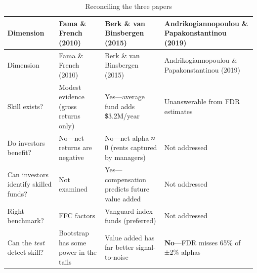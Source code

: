 \documentclass[
  letterpaper,
  DIV=11,
  numbers=noendperiod]{scrartcl}
\begin{document}
\begin{longtable}[]{@{}
  >{\raggedright\arraybackslash}p{}
  >{\raggedright\arraybackslash}p{}
  >{\raggedright\arraybackslash}p{}
  >{\raggedright\arraybackslash}p{}@{}}
\caption{Reconciling the three papers}\tabularnewline
\toprule\noalign{}
\begin{minipage}[b]{\linewidth}\raggedright
Dimension
\end{minipage} & \begin{minipage}[b]{\linewidth}\raggedright
Fama \& French (2010)
\end{minipage} & \begin{minipage}[b]{\linewidth}\raggedright
Berk \& van Binsbergen (2015)
\end{minipage} & \begin{minipage}[b]{\linewidth}\raggedright
Andrikogiannopoulou \& Papakonstantinou (2019)
\end{minipage} \\
\midrule\noalign{}
\endfirsthead
\toprule\noalign{}
\begin{minipage}[b]{\linewidth}\raggedright
Dimension
\end{minipage} & \begin{minipage}[b]{\linewidth}\raggedright
Fama \& French (2010)
\end{minipage} & \begin{minipage}[b]{\linewidth}\raggedright
Berk \& van Binsbergen (2015)
\end{minipage} & \begin{minipage}[b]{\linewidth}\raggedright
Andrikogiannopoulou \& Papakonstantinou (2019)
\end{minipage} \\
\midrule\noalign{}
\endhead
\bottomrule\noalign{}
\endlastfoot
Skill exists? & Modest evidence (gross returns only) & Yes---average
fund adds \$3.2M/year & Unanswerable from FDR estimates \\
Do investors benefit? & No---net returns are negative & No---net alpha ≈
0 (rents captured by managers) & Not addressed \\
Can investors identify skilled funds? & Not examined &
Yes---compensation predicts future value added & Not addressed \\
Right benchmark? & FFC factors & Vanguard index funds (preferred) & Not
addressed \\
Can the \emph{test} detect skill? & Bootstrap has some power in the
tails & Value added has far better signal-to-noise & \textbf{No}---FDR
misses 65\% of ±2\% alphas \\
\end{longtable}
\end{document}
